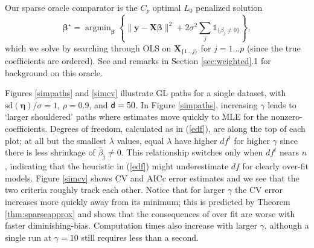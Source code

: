 \documentclass[12pt]{article}
\newcommand{\bs}[1]{\boldsymbol{#1}}
\newcommand{\mr}[1]{\mathrm{#1}}
\newcommand{\bm}[1]{\mathbf{#1}}
\newcommand{\ds}[1]{\mathds{#1}}
\DeclareMathOperator*{\argmin}{argmin}
\begin{document}
Our sparse oracle comparator is the $C_p$ optimal $L_0$ penalized solution
\begin{equation}\label{l0oracle}
\bs{\beta}^{\star} = \argmin_{\bs{\beta}} \left\{ \|\bm{y}-\bm{X}\bs{\beta}\|^2 + 2\sigma^2\sum_j
\ds{1}_{\{\beta_j\neq0\}}\right\},
\end{equation} which we solve by searching through
OLS on $\bm{X}_{\{1\ldots j\}}$ for $j=1\ldots p$ (since the true coefficients are ordered).
See \cite{mallows_comments_1973} and remarks in Section \ref{sec:weighted}.1 for background on this oracle.


Figures \ref{simpaths} and \ref{simcv} illustrate GL paths for a single
dataset, with  $\mr{sd}(\bm{\eta})/\sigma=1$, $\rho=0.9$, and ${\sf d}=50$. In Figure
\ref{simpaths}, increasing $\gamma$ leads to `larger shouldered' paths where
estimates move quickly to MLE for the nonzero-coefficients. Degrees of
freedom, calculated as in (\ref{edf}), are along the top of each plot; at all but the smallest $\lambda$ values, equal
$\lambda$ have higher $df^t$ for higher $\gamma$ since there is less shrinkage
of $\hat\beta_j\neq0$.   This relationship switches only when $df^t$
nears $n$, indicating that the heuristic in (\ref{edf}) might underestimate $df$ for clearly over-fit models.
Figure \ref{simcv} shows CV and AICc error estimates and we see that 
the two criteria roughly track each other.  Notice that
for larger $\gamma$ the CV error increases more quickly away from
its minimum; this is predicted by Theorem \ref{thm:sparseapprox} and shows that the consequences of over fit are worse with
faster diminishing-bias.  Computation times also increase with larger $\gamma$, although a
single run at $\gamma=10$ still requires less than a second.
\end{document}
